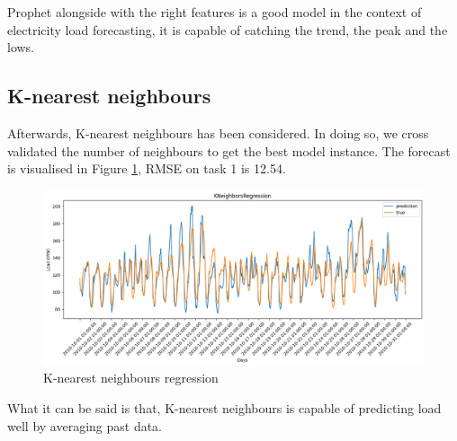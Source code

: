 
Prophet alongside with the right features is a good model in the context of electricity load forecasting, it is capable of catching the trend, the peak and the lows. 

\subsection{K-nearest neighbours}
Afterwards, K-nearest neighbours has been considered. In doing so, we cross validated the number of neighbours to get the best model instance. The forecast is visualised in Figure \ref{fig:knn_price}, RMSE on task 1 is 12.54.
\begin{figure}[!ht]
    \includegraphics[width=\textwidth]{images/knn_price.png}
    \caption{K-nearest neighbours regression}
    \label{fig:knn_price}
\end{figure}
What it can be said is that, K-nearest neighbours is capable of predicting load well by averaging past data.


